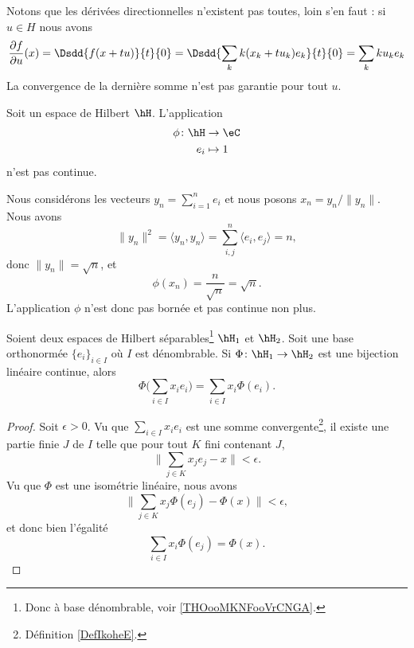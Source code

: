 Notons que les dérivées directionnelles n'existent pas toutes, loin s'en faut : si \( u\in H\) nous avons
\begin{equation}        \label{EQooWNLOooJNRUMQ}
	\frac{ \partial f }{ \partial u }(x)=\Dsdd{ f(x+tu) }{t}{0}=\Dsdd{ \sum_k k(x_k+tu_k)e_k }{t}{0}=\sum_k ku_ke_k
\end{equation}
La convergence de la dernière somme n'est pas garantie pour tout \( u\).

\begin{example}
	Soit un espace de Hilbert \( \hH\). L'application
	\begin{equation}
		\begin{aligned}
			\phi\colon \hH & \to \eC   \\
			e_i            & \mapsto 1
		\end{aligned}
	\end{equation}
	n'est pas continue.

	Nous considérons les vecteurs \( y_n=\sum_{i=1}^ne_i\) et nous posons \( x_n=y_n/\| y_n \|\). Nous avons
	\begin{equation}
		\| y_n \|^2=\langle y_n, y_n\rangle =\sum_{i,j}^n\langle e_i, e_j\rangle =n,
	\end{equation}
	donc \( \| y_n \|=\sqrt{ n }\), et
	\begin{equation}
		\phi(x_n)=\frac{ n }{ \sqrt{ n } }=\sqrt{ n }.
	\end{equation}
	L'application \( \phi\) n'est donc pas bornée et pas continue non plus.
\end{example}

\begin{proposition}     \label{PROPooWHZKooEXEIrV}
	Soient deux espaces de Hilbert séparables\footnote{Donc à base dénombrable, voir \ref{THOooMKNFooVrCNGA}.} \( \hH_1\) et \( \hH_2\). Soit une base orthonormée \( \{ e_i \}_{i\in I}\) où \( I\) est dénombrable. Si \( \Phi\colon \hH_1\to \hH_2\) est une bijection linéaire continue, alors
	\begin{equation}
		\Phi\big( \sum_{i\in I}x_ie_i \big)=\sum_{i\in I}x_i\Phi(e_i).
	\end{equation}
\end{proposition}

\begin{proof}
	Soit \( \epsilon>0\). Vu que \( \sum_{i\in I}x_ie_i\) est une somme convergente\footnote{Définition \ref{DefIkoheE}.}, il existe une partie finie \( J\) de \( I\) telle que pour tout \( K\) fini contenant \( J\),
	\begin{equation}
		\| \sum_{j\in K}x_je_j-x \|<\epsilon.
	\end{equation}
	Vu que \( \Phi\) est une isométrie linéaire, nous avons
	\begin{equation}
		\| \sum_{j\in K}x_j\Phi(e_j)-\Phi(x) \|<\epsilon,
	\end{equation}
	et donc bien l'égalité
	\begin{equation}
		\sum_{i\in I}x_i\Phi(e_j)=\Phi(x).
	\end{equation}
\end{proof}


